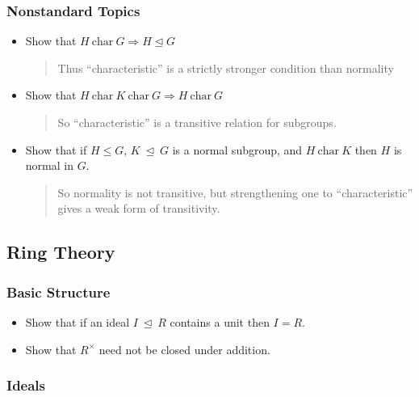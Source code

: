 \hypertarget{nonstandard-topics}{%
\subsubsection{Nonstandard Topics}\label{nonstandard-topics}}

\begin{itemize}
\item
  Show that \(H~\text{char}~G \Rightarrow H \unlhd G\)

  \begin{quote}
  Thus ``characteristic'' is a strictly stronger condition than
  normality
  \end{quote}
\item
  Show that
  \(H ~\text{char}~ K ~\text{char}~G \Rightarrow H ~\text{char}~ G\)

  \begin{quote}
  So ``characteristic'' is a transitive relation for subgroups.
  \end{quote}
\item
  Show that if \(H \leq G\), \(K{~\trianglelefteq~}G\) is a normal
  subgroup, and \(H~\text{char}~K\) then \(H\) is normal in \(G\).

  \begin{quote}
  So normality is not transitive, but strengthening one to
  ``characteristic'' gives a weak form of transitivity.
  \end{quote}
\end{itemize}

\hypertarget{ring-theory}{%
\subsection{Ring Theory}\label{ring-theory}}

\hypertarget{basic-structure}{%
\subsubsection{Basic Structure}\label{basic-structure}}

\begin{itemize}
\tightlist
\item
  Show that if an ideal \(I{~\trianglelefteq~}R\) contains a unit then
  \(I = R\).
\item
  Show that \(R^{\times}\) need not be closed under addition.
\end{itemize}

\hypertarget{ideals}{%
\subsubsection{Ideals}\label{ideals}}

